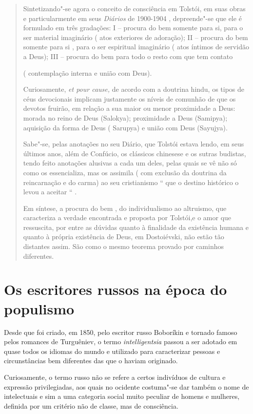 \begin{quote}
Sintetizando"-se agora o conceito de consciência em Tolstói, em suas
obras e particularmente em seus \emph{Diários} de 1900-1904 ,
depreende"-se que ele é formulado em três gradações: I -- procura do bem
somente para si, para o ser material imaginário ( atos exteriores de
adoração); II -- procura do bem somente para si , para o ser espiritual
imaginário ( atos íntimos de servidão a Deus); III -- procura do bem
para todo o resto com que tem contato

( contemplação interna e união com Deus).

Curiosamente, \emph{et pour cause,} de acordo com a doutrina hindu, os
tipos de céus devocionais implicam justamente os níveis de comunhão de
que os devotos fruirão, em relação a sua maior ou menor proximidade a
Deus: morada no reino de Deus (Salokya); proximidade a Deus (Samipya);
aquisição da forma de Deus ( Sarupya) e união com Deus (Sayujya).

Sabe"-se, pelas anotações no seu Diário, que Tolstói estava lendo, em
seus últimos anos, além de Confúcio, os clássicos chinesese e os sutras
budistas, tendo feito anotações alusivas a cada um deles, pelas quais se
vê não só como os essencializa, mas os assimila ( com exclusão da
doutrina da reincarnação e do carma) ao seu cristianismo `` que o
destino histórico o levou a aceitar `` .

Em síntese, a procura do bem , do individualismo ao altruismo, que
caracteriza a verdade encontrada e proposta por Tolstói,e o amor que
ressuscita, por entre as dúvidas quanto à finalidade da existência
humana e quanto à própria existência de Deus, em Dostoiévski, não estão
tão distantes assim. São como o mesmo teorema provado por caminhos
diferentes.
\end{quote}

\chapter{Os escritores russos na época do populismo}

Desde que foi criado, em 1850, pelo escritor russo Boboríkin e tornado
famoso pelos romances de Turguêniev, o termo \emph{intelligentsia}
passou a ser adotado em quase todos os idiomas do mundo e utilizado para
caracterizar pessoas e circunstâncias bem diferentes das que o haviam
originado.

Curiosamente, o termo russo não se refere a certos indivíduos de cultura
e expressão privilegiadas, aos quais no ocidente costuma"-se dar também o
nome de intelectuais e sim a uma categoria social muito peculiar de
homens e mulheres, definida por um critério não de classe, mas de
consciência.

